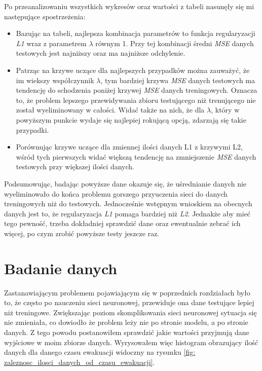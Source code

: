 \documentclass[12pt]{aghdpl}
\begin{document}
		Po przeanalizowaniu wszystkich wykresów oraz wartości z tabeli nasunęły się mi następujące spostrzeżenia:
		\begin{itemize}
		\item Bazując na tabeli, najlepsza kombinacja parametrów to funkcja regularyzacji \textit{L1} wraz z parametrem $\lambda$ równym 1. Przy tej kombinacji średni \textit{MSE} danych testowych jest najniższy oraz ma najniższe odchylenie.
		\item Patrząc na krzywe uczące dla najlepszych przypadków można zauważyć, że im wiekszy współczynnik $\lambda$, tym bardziej krzywa \textit{MSE} danych testowych ma tendencję do schodzenia poniżej krzywej \textit{MSE} danych treningowych. Oznacza to, że problem lepszego przewidywania zbioru testującego niż trenującego nie został wyeliminowany w całości. Widać także na nich, że dla $\lambda$, który w powyższym punkcie wydaje się najlepiej rokującą opcją, zdarzają się takie przypadki.
		\item Porównując krzywe uczące dla zmiennej ilości danych L1 z krzywymi L2, wśród tych pierwszych widać większą tendencję na zmniejszenie \textit{MSE} danych testowych przy większej ilości danych.
		\end{itemize}				
		
		Podsumowując, badając powyższe dane okazuje się, że uśrednianie danych nie wyeliminowało do końca problemu gorszego przyuczenia sieci do danych treningowych niż do testowych. Jednocześnie wstępnym wnioskiem na obecnych danych jest to, że regularyzacja \textit{L1} pomaga bardziej niż \textit{L2}. Jednakże aby mieć tego pewność, trzeba dokładniej sprawdzić dane oraz ewentualnie zebrać ich więcej, po czym zrobić powyższe testy jeszcze raz.
		
		\section{Badanie danych}
		Zastanawiającym problemem pojawiającym się w poprzednich rozdziałach było to, że często po nauczeniu sieci neuronowej, przewiduje ona dane testujące lepiej niż treningowe. Zwiększając poziom skomplikowania sieci neuronowej sytuacja się nie zmieniała, co dowiodło że problem leży nie po stronie modelu, a po stronie danych. Z tego powodu postanowiłem sprawdzić jakie wartości przyjmują dane wyjściowe w moim zbiorze danych. Wyrysowałem więc histogram obrazujący ilość danych dla danego czasu ewakuacji widoczny na rysunku \ref{fig: zaleznosc_ilosci_danych_od_czasu_ewakuacji}.
		
\end{document}

